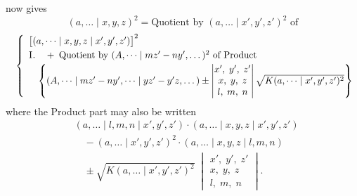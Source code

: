 \documentclass[11pt]{article}
\begin{document}
now gives
\[ (a,\dots \mid x,y,z)^{2}=\text{Quotient by }(a,\dots \mid x',y',z')^{2}\text{ of} \]
\[ \quad\left\{\begin{array}{l}
\bigl[(a,\dots \mid x,y,z \mid x',y',z')\bigr]^{2}\\[0.3em]
\textsc{I.}\quad +\;\text{Quotient by }(A,\dots \mid mz'-ny',\dots)^{2}\text{ of Product}\\[0.3em]
\quad\left\{(A,\dots \mid mz'-ny',\dots \mid yz'-y'z,\dots)\pm
\begin{vmatrix}x',\;y',\;z'\\ x,\;y,\;z\\ l,\;m,\;n\end{vmatrix}\sqrt{K(a,\dots \mid x',y',z')^{2}}\right\}
\end{array}\right. \]
where the Product part may also be written
\[ \begin{aligned}
&(a,\dots \mid l,m,n \mid x',y',z')\cdot(a,\dots \mid x,y,z \mid x',y',z')\\
&\quad -(a,\dots \mid x',y',z')^{2}\cdot(a,\dots \mid x,y,z \mid l,m,n)\\
&\quad \pm\sqrt{K(a,\dots \mid x',y',z')^{2}}\;
\begin{vmatrix}x',\;y',\;z'\\ x,\;y,\;z\\ l,\;m,\;n\end{vmatrix}.
\end{aligned} \]
\end{document}
